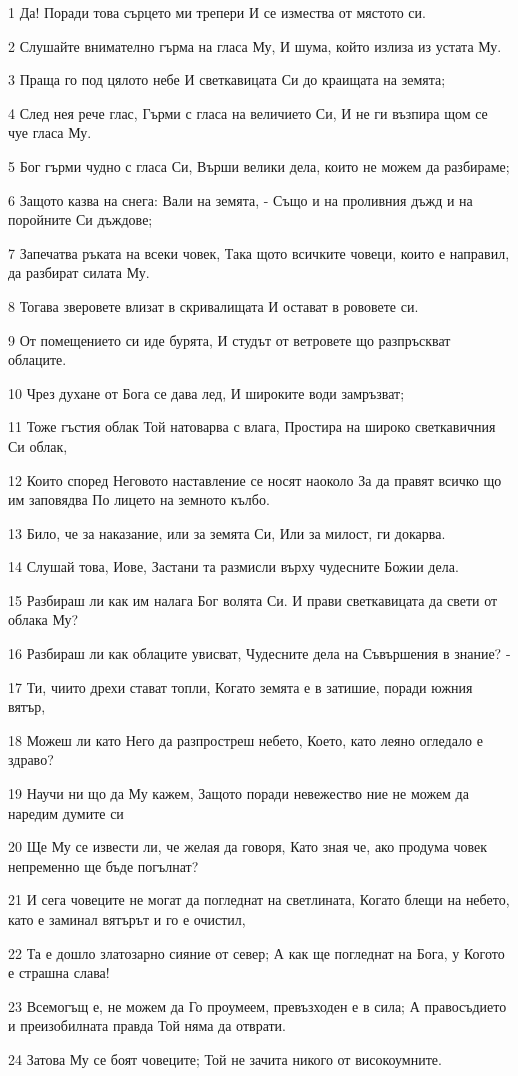 \par 1 Да! Поради това сърцето ми трепери И се измества от мястото си.
\par 2 Слушайте внимателно гърма на гласа Му, И шума, който излиза из устата Му.
\par 3 Праща го под цялото небе И светкавицата Си до краищата на земята;
\par 4 След нея рече глас, Гърми с гласа на величието Си, И не ги възпира щом се чуе гласа Му.
\par 5 Бог гърми чудно с гласа Си, Върши велики дела, които не можем да разбираме;
\par 6 Защото казва на снега: Вали на земята, - Също и на проливния дъжд и на поройните Си дъждове;
\par 7 Запечатва ръката на всеки човек, Така щото всичките човеци, които е направил, да разбират силата Му.
\par 8 Тогава зверовете влизат в скривалищата И остават в рововете си.
\par 9 От помещението си иде бурята, И студът от ветровете що разпръскват облаците.
\par 10 Чрез духане от Бога се дава лед, И широките води замръзват;
\par 11 Тоже гъстия облак Той натоварва с влага, Простира на широко светкавичния Си облак,
\par 12 Които според Неговото наставление се носят наоколо За да правят всичко що им заповядва По лицето на земното кълбо.
\par 13 Било, че за наказание, или за земята Си, Или за милост, ги докарва.
\par 14 Слушай това, Иове, Застани та размисли върху чудесните Божии дела.
\par 15 Разбираш ли как им налага Бог волята Си. И прави светкавицата да свети от облака Му?
\par 16 Разбираш ли как облаците увисват, Чудесните дела на Съвършения в знание? -
\par 17 Ти, чиито дрехи стават топли, Когато земята е в затишие, поради южния вятър,
\par 18 Можеш ли като Него да разпростреш небето, Което, като леяно огледало е здраво?
\par 19 Научи ни що да Му кажем, Защото поради невежество ние не можем да наредим думите си
\par 20 Ще Му се извести ли, че желая да говоря, Като зная че, ако продума човек непременно ще бъде погълнат?
\par 21 И сега човеците не могат да погледнат на светлината, Когато блещи на небето, като е заминал вятърът и го е очистил,
\par 22 Та е дошло златозарно сияние от север; А как ще погледнат на Бога, у Когото е страшна слава!
\par 23 Всемогъщ е, не можем да Го проумеем, превъзходен е в сила; А правосъдието и преизобилната правда Той няма да отврати.
\par 24 Затова Му се боят човеците; Той не зачита никого от високоумните.

